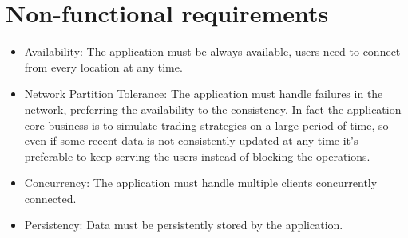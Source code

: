 \section{Non-functional requirements}\label{sec:nonfunctionalrequirements}

\begin{itemize}
	\item Availability: The application must be always available, users need to connect from every location at any time.
	\item Network Partition Tolerance: The application must handle failures in the network, preferring the availability to the consistency. In fact the application core business is to simulate trading strategies on a large period of time, so even if some recent data is not consistently updated at any time it's preferable to keep serving the users instead of blocking the operations. 
	\item Concurrency: The application must handle multiple clients concurrently connected.
	\item Persistency: Data must be persistently stored by the application.
\end{itemize}
